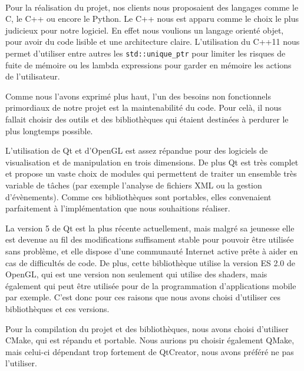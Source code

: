 \paragraph{}
        Pour la réalisation du projet, nos clients nous proposaient des langages comme le C, le C++ ou encore le Python. Le C++ nous est apparu comme le choix le plus judicieux pour notre logiciel. En effet nous voulions un langage orienté objet, pour avoir du code lisible et une architecture claire. L'utilisation du C++11 nous permet d'utiliser entre autres les \texttt{std::unique\_ptr} pour limiter les risques de fuite de mémoire ou les lambda expressions pour garder en mémoire les actions de l'utilisateur.

    Comme nous l'avons exprimé plus haut, l'un des besoins non fonctionnels primordiaux de notre projet est la maintenabilité du code. Pour celà, il nous fallait choisir des outils et des bibliothèques qui étaient destinées à perdurer le plus longtemps possible.
    
    L'utilisation de Qt et d'OpenGL est assez répandue pour des logiciels de visualisation et de manipulation en trois dimensions. De plus Qt est très complet et propose un vaste choix de modules qui permettent de traiter un ensemble très variable de tâches (par exemple l'analyse de fichiers XML ou la gestion d'évènements). Comme ces bibliothèques sont portables, elles convenaient parfaitement à l'implémentation que nous souhaitions réaliser.
    
    La version 5 de Qt est la plus récente actuellement, mais malgré sa jeunesse elle est devenue au fil des modifications suffisament stable pour pouvoir être utilisée sans problème, et elle dispose d'une communauté Internet active prête à aider en cas de difficultés de code. De plus, cette bibliothèque utilise la version ES 2.0 de OpenGL, qui est une version non seulement qui utilise des shaders, mais également qui peut être utilisée pour de la programmation d'applications mobile par exemple. C'est donc pour ces raisons que nous avons choisi d'utiliser ces bibliothèques et ces versions.

    Pour la compilation du projet et des bibliothèques, nous avons choisi d'utiliser CMake, qui est répandu et portable. Nous aurions pu choisir également QMake, mais celui-ci dépendant trop fortement de QtCreator, nous avons préféré ne pas l'utiliser.

